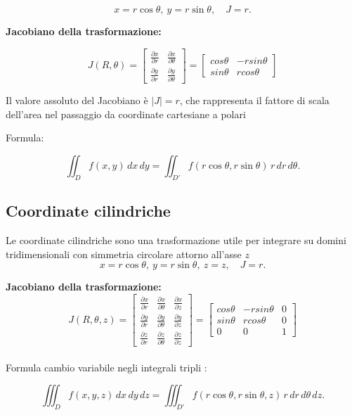 \documentclass[a4paper,12pt]{article}
\begin{document}
\[
x=r\cos\theta,\ y=r\sin\theta,\quad J=r.
\]

\textbf{Jacobiano della trasformazione: }

\[
J(R, \theta) = 
\begin{bmatrix}
\frac{\partial x}{\partial r} & \frac{\partial x}{\partial \theta}\\
\frac{\partial y}{\partial r} & \frac{\partial y}{\partial \theta}
\end{bmatrix} = 
\begin{bmatrix}
cos\theta & -rsin\theta\\
sin\theta & rcos\theta
\end{bmatrix}
\]

Il valore assoluto del Jacobiano è $|J| = r$, che rappresenta il fattore di scala dell'area nel passaggio da coordinate cartesiane a polari 

Formula:


\[
\iint_D f(x,y)\,dx\,dy=\iint_{D'} f(r\cos\theta,r\sin\theta)\,r\,dr\,d\theta.
\]



\subsection{Coordinate cilindriche}
Le coordinate cilindriche sono una trasformazione utile per integrare su domini tridimensionali con simmetria circolare attorno all'asse $z$\\

\[
x=r\cos\theta,\ y=r\sin\theta,\ z=z,\quad J=r.
\]

\textbf{Jacobiano della trasformazione: }
\[
J(R, \theta, z) = 
\begin{bmatrix}
\frac{\partial x}{\partial r} & \frac{\partial x}{\partial \theta} & \frac{\partial x}{\partial z}\\
\frac{\partial y}{\partial r} & \frac{\partial y}{\partial \theta} & \frac{\partial y}{\partial z}\\
\frac{\partial z}{\partial r} & \frac{\partial z}{\partial \theta} & \frac{\partial z}{\partial z}
\end{bmatrix} = 
\begin{bmatrix}
cos\theta & -rsin\theta & 0\\
sin\theta & rcos\theta & 0 \\
0 & 0 & 1
\end{bmatrix}
\]\\
Formula cambio variabile negli integrali tripli :

\[
\iiint_D f(x,y,z)\,dx\,dy\,dz=\iiint_{D'} f(r\cos\theta,r\sin\theta,z)\,r\,dr\,d\theta\,dz.
\]
\end{document}
